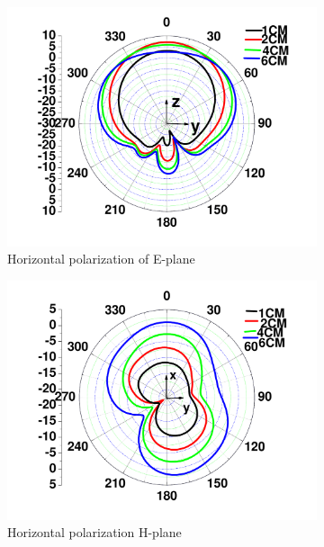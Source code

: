 \documentclass[journal]{IEEEtran}
\begin{document}
\begin{figure}[!htb]
\centering
\begin{subfigure}[b]{0.24\textwidth}
\includegraphics[width=\textwidth]{figs/12a.pdf}
\caption{Horizontal polarization of E-plane}
\label{fig:12a}	
\end{subfigure}		
\begin{subfigure}[b]{0.24\textwidth}
\includegraphics[width=\textwidth]{figs/12b.pdf}
\caption{Horizontal polarization H-plane}
\label{fig:12b}	
\end{subfigure}
\begin{subfigure}[b]{0.24\textwidth}

\end{subfigure}
\end{figure}
\end{document}
